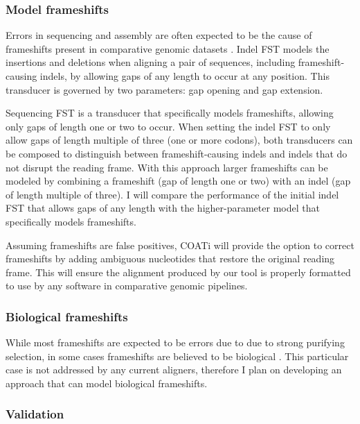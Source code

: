 \subsubsection{Model frameshifts}



Errors in sequencing and assembly are often expected to be the cause of
frameshifts present in comparative genomic datasets .
Indel FST models the insertions and deletions when aligning a pair of sequences,
including frameshift-causing indels, by allowing gaps of any length to occur at
any position.
This transducer is governed by two parameters: gap opening and gap extension.

Sequencing FST is a transducer that specifically models frameshifts, allowing
only gaps of length one or two to occur.
When setting the indel FST to only allow gaps of length multiple of three (one
or more codons), both transducers can be composed to distinguish between
frameshift-causing indels and indels that do not disrupt the reading frame.
With this approach larger frameshifts can be modeled by combining a frameshift
(gap of length one or two) with an indel (gap of length multiple of three).
I will compare the performance of the initial indel FST that allows gaps of any
length with the higher-parameter model that specifically models frameshifts.


Assuming frameshifts are false positives, COATi will provide the option to
correct frameshifts by adding ambiguous nucleotides that restore the original
reading frame.
This will ensure the alignment produced by our tool is properly formatted to use
by any software in comparative genomic pipelines.

\subsubsection{Biological frameshifts}

While most frameshifts are expected to be errors due to due to strong purifying
selection, in some cases frameshifts are believed to be biological
.
This particular case is not addressed by any current aligners, therefore I plan
on developing an approach that can model biological frameshifts.

\subsubsection{Validation}
